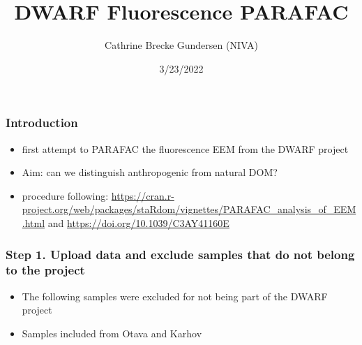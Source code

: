 \documentclass[
]{article}
\title{DWARF Fluorescence PARAFAC}
\author{Cathrine Brecke Gundersen (NIVA)}
\date{3/23/2022}
\providecommand{\tightlist}{%
  \setlength{\itemsep}{0pt}\setlength{\parskip}{0pt}}
\begin{document}
\maketitle

\hypertarget{introduction}{%
\subsubsection{Introduction}\label{introduction}}

\begin{itemize}
\tightlist
\item
  first attempt to PARAFAC the fluorescence EEM from the DWARF project
\item
  Aim: can we distinguish anthropogenic from natural DOM?
\item
  procedure following:
  \url{https://cran.r-project.org/web/packages/staRdom/vignettes/PARAFAC_analysis_of_EEM.html}
  and \url{https://doi.org/10.1039/C3AY41160E}
\end{itemize}

\hypertarget{step-1.-upload-data-and-exclude-samples-that-do-not-belong-to-the-project}{%
\subsubsection{Step 1. Upload data and exclude samples that do not
belong to the
project}\label{step-1.-upload-data-and-exclude-samples-that-do-not-belong-to-the-project}}

\begin{itemize}
\tightlist
\item
  The following samples were excluded for not being part of the DWARF
  project
\item
  Samples included from Otava and Karhov
\end{itemize}
\end{document}
